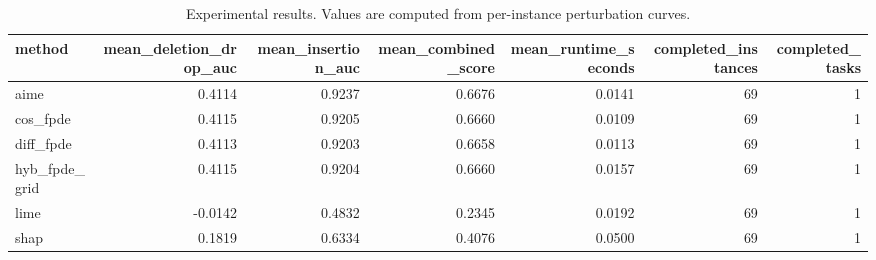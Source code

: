 \begin{table}[t]
\caption{Experimental results. Values are computed from per-instance perturbation curves.}
\label{tab:main_results_computed}
\centering
\begin{tabular}{lrrrrrr}
\toprule
method & mean\_deletion\_drop\_auc & mean\_insertion\_auc & mean\_combined\_score & mean\_runtime\_seconds & completed\_instances & completed\_tasks \\
\midrule
aime & 0.4114 & 0.9237 & 0.6676 & 0.0141 & 69 & 1 \\
cos\_fpde & 0.4115 & 0.9205 & 0.6660 & 0.0109 & 69 & 1 \\
diff\_fpde & 0.4113 & 0.9203 & 0.6658 & 0.0113 & 69 & 1 \\
hyb\_fpde\_grid & 0.4115 & 0.9204 & 0.6660 & 0.0157 & 69 & 1 \\
lime & -0.0142 & 0.4832 & 0.2345 & 0.0192 & 69 & 1 \\
shap & 0.1819 & 0.6334 & 0.4076 & 0.0500 & 69 & 1 \\
\bottomrule
\end{tabular}

\end{table}
